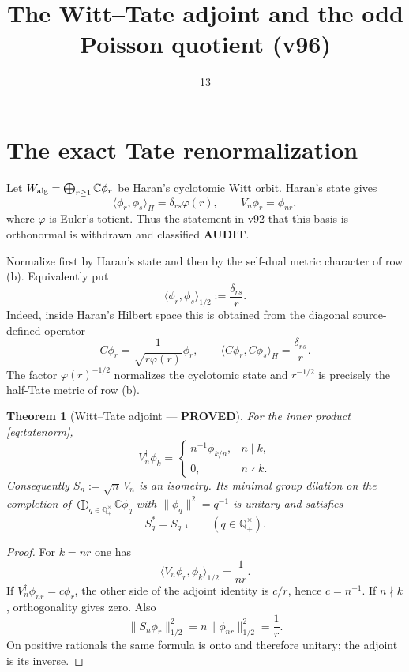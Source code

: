 \documentclass[11pt]{article}
\title{The Witt--Tate adjoint and the odd Poisson quotient (v96)}
\date{13}
\newcommand{\PROVED}{\textcolor{green!40!black}{\textbf{PROVED}}}
\newcommand{\AUDIT}{\textcolor{orange!70!black}{\textbf{AUDIT}}}
\newtheorem{theorem}{Theorem}
\begin{document}
\maketitle

\section{The exact Tate renormalization}

Let $W_{\rm alg}=\bigoplus_{r\geq1}\mathbb C\phi_r$ be Haran's
cyclotomic Witt orbit.  Haran's state gives
\[
 \langle\phi_r,\phi_s\rangle_H=\delta_{rs}\varphi(r),
 \qquad V_n\phi_r=\phi_{nr},
\]
where $\varphi$ is Euler's totient.  Thus the statement in v92 that this
basis is orthonormal is withdrawn and classified \AUDIT.

Normalize first by Haran's state and then by the self-dual metric character
of row (b).  Equivalently put
\begin{equation}\label{eq:tatenorm}
 \langle\phi_r,\phi_s\rangle_{1/2}:=\frac{\delta_{rs}}{r}.
\end{equation}
Indeed, inside Haran's Hilbert space this is obtained from the diagonal
source-defined operator
\[
 C\phi_r=\frac1{\sqrt{r\varphi(r)}}\phi_r,
 \qquad
 \langle C\phi_r,C\phi_s\rangle_H=\frac{\delta_{rs}}r.
\]
The factor $\varphi(r)^{-1/2}$ normalizes the cyclotomic state and
$r^{-1/2}$ is precisely the half-Tate metric of row (b).

\begin{theorem}[Witt--Tate adjoint --- \PROVED]\label{thm:wittadjoint}
For the inner product \eqref{eq:tatenorm},
\begin{equation}\label{eq:Vadjoint}
 V_n^\dagger\phi_k=
 \begin{cases}
  n^{-1}\phi_{k/n},&n\mid k,\\
  0,&n\nmid k.
 \end{cases}
\end{equation}
Consequently $S_n:=\sqrt n\,V_n$ is an isometry.  Its minimal group dilation
on the completion of
$\bigoplus_{q\in\mathbb Q_+^\times}\mathbb C\phi_q$ with
$\|\phi_q\|^2=q^{-1}$ is unitary and satisfies
\[
 S_q^*=S_{q^{-1}}\qquad(q\in\mathbb Q_+^\times).
\]
\end{theorem}

\begin{proof}
For $k=nr$ one has
\[
 \langle V_n\phi_r,\phi_k\rangle_{1/2}=\frac1{nr}.
\]
If $V_n^\dagger\phi_{nr}=c\phi_r$, the other side of the adjoint identity is
$c/r$, hence $c=n^{-1}$.  If $n\nmid k$, orthogonality gives zero.  Also
\[
 \|S_n\phi_r\|_{1/2}^2
 =n\|\phi_{nr}\|_{1/2}^2=\frac1r.
\]
On positive rationals the same formula is onto and therefore unitary; the
adjoint is its inverse.
\end{proof}
\end{document}

